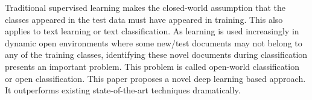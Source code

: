 Traditional supervised learning makes the closed-world assumption that the classes appeared in the test data must have appeared in training. This also applies to text learning or text classification. As learning is used increasingly in dynamic open environments where some new/test documents may not belong to any of the training classes, identifying these novel documents during classification presents an important problem. This problem is called open-world classification or open classification. This paper proposes a novel deep learning based approach. It outperforms existing state-of-the-art techniques dramatically.
